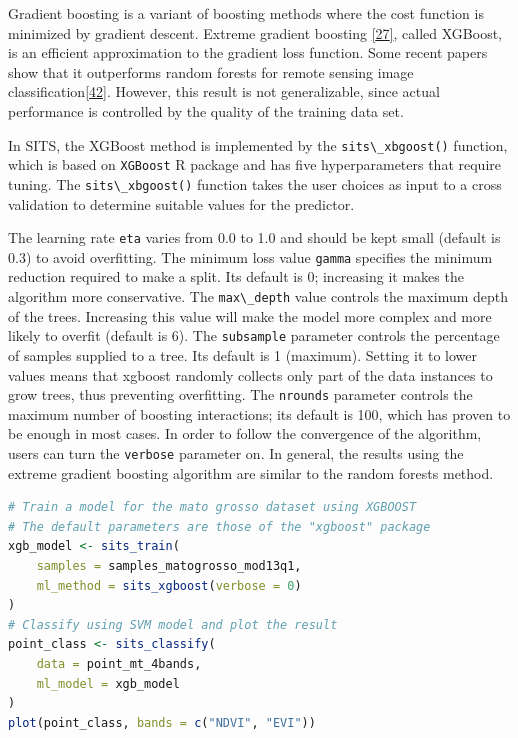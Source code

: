 \documentclass[
  11pt,
]{report}
\newcommand{\passthrough}[1]{#1}
\begin{document}
Gradient boosting is a variant of boosting methods where the cost
function is minimized by gradient descent. Extreme gradient boosting
\protect\hyperlink{ref-Chen2016}{{[}27{]}}, called XGBoost, is an
efficient approximation to the gradient loss function. Some recent
papers show that it outperforms random forests for remote sensing image
classification\protect\hyperlink{ref-Jafarzadeh2021}{{[}42{]}}. However,
this result is not generalizable, since actual performance is controlled
by the quality of the training data set.

In SITS, the XGBoost method is implemented by the
\passthrough{\lstinline!sits\_xbgoost()!} function, which is based on
\passthrough{\lstinline!XGBoost!} R package and has five hyperparameters
that require tuning. The \passthrough{\lstinline!sits\_xbgoost()!}
function takes the user choices as input to a cross validation to
determine suitable values for the predictor.

The learning rate \passthrough{\lstinline!eta!} varies from 0.0 to 1.0
and should be kept small (default is 0.3) to avoid overfitting. The
minimum loss value \passthrough{\lstinline!gamma!} specifies the minimum
reduction required to make a split. Its default is 0; increasing it
makes the algorithm more conservative. The
\passthrough{\lstinline!max\_depth!} value controls the maximum depth of
the trees. Increasing this value will make the model more complex and
more likely to overfit (default is 6). The
\passthrough{\lstinline!subsample!} parameter controls the percentage of
samples supplied to a tree. Its default is 1 (maximum). Setting it to
lower values means that xgboost randomly collects only part of the data
instances to grow trees, thus preventing overfitting. The
\passthrough{\lstinline!nrounds!} parameter controls the maximum number
of boosting interactions; its default is 100, which has proven to be
enough in most cases. In order to follow the convergence of the
algorithm, users can turn the \passthrough{\lstinline!verbose!}
parameter on. In general, the results using the extreme gradient
boosting algorithm are similar to the random forests method.

\begin{lstlisting}[language=R]
# Train a model for the mato grosso dataset using XGBOOST
# The default parameters are those of the "xgboost" package
xgb_model <- sits_train(
    samples = samples_matogrosso_mod13q1, 
    ml_method = sits_xgboost(verbose = 0)
)
# Classify using SVM model and plot the result
point_class <- sits_classify(
    data = point_mt_4bands, 
    ml_model = xgb_model
)
plot(point_class, bands = c("NDVI", "EVI"))
\end{lstlisting}
\end{document}
